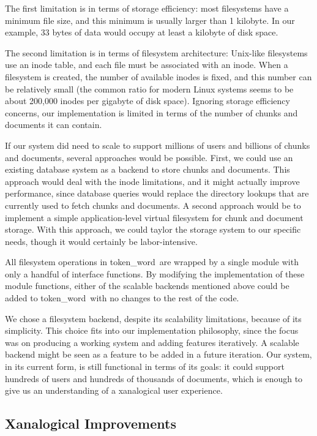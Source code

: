 \documentclass{acm_proc_article-sp}
\newcommand{\tw}{token\_word}
\begin{document}
The first limitation is in terms of storage efficiency:  most filesystems have a minimum file size, and this minimum is usually larger than 1 kilobyte.
In our example, 33 bytes of data would occupy at least a kilobyte of disk space.

The second limitation is in terms of filesystem architecture:  Unix-like filesystems use an inode table, and each file must be associated with an inode.
When a filesystem is created, the number of available inodes is fixed, and this number can be relatively small (the common ratio for modern Linux systems seems to be about 200,000 inodes per gigabyte of disk space). \cite{OperatingSystems}
Ignoring storage efficiency concerns, our implementation is limited in terms of the number of chunks and documents it can contain.

If our system did need to scale to support millions of users and billions of chunks and documents, several approaches would be possible.
First, we could use an existing database system as a backend to store chunks and documents.
This approach would deal with the inode limitations, and it might actually improve performance, since database queries would replace the directory lookups that are currently used to fetch chunks and documents.
A second approach would be to implement a simple application-level virtual filesystem for chunk and document storage.
With this approach, we could taylor the storage system to our specific needs, though it would certainly be labor-intensive.

All filesystem operations in \tw \ are wrapped by a single module with only a handful of interface functions.
By modifying the implementation of these module functions, either of the scalable backends mentioned above could be added to \tw \ with no changes to the rest of the code. 

We chose a filesystem backend, despite its scalability limitations, because of its simplicity.
This choice fits into our implementation philosophy, since the focus was on producing a working system and adding features iteratively.
A scalable backend might be seen as a feature to be added in a future iteration.
Our system, in its current form, is still functional in terms of its goals:  it could support hundreds of users and hundreds of thousands of documents, which is enough to give us an understanding of a xanalogical user experience.


\subsection{Xanalogical Improvements}
\end{document}
